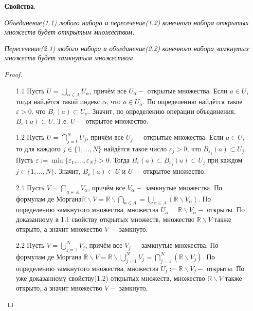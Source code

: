 \documentclass[12pt]{article}
\begin{document}
\textbf{Свойства}.

\textit{Объединение(1.1) любого набора и пересечение(1.2) конечного набора открытых множеств будет открытым множеством.}

\textit{Пересечение(2.1) любого набора и объединение(2.2) конечного набора замкнутых множеств будет замкнутым множеством.}

\begin{proof}

 

\begin{itemize}
    \item[1.1] Пусть $U = \bigcup\limits_{\alpha\in A}U_\alpha$, причём все $U_\alpha - $ открытые множества. Если $a\in U$, тогда найдётся такой индекс $\alpha$, что $a\in U_\alpha$. По определению найдётся такое $\varepsilon > 0$, что $B_\varepsilon(a) \subset U_\alpha$. Значит, по определению операции объединения, $B_\varepsilon(a)\subset U$. Т.е. $U - $ открытое множество.
    \item[1.2] Пусть $U = \bigcap\limits_{j=1}^NU_j$, причём все $U_j - $ открытые множества. Если $a\in U$, то для каждого \newline$j\in \{1,...,N\}$ найдётся такое число $\varepsilon_j>0$, что $B_{\varepsilon_j}(a) \subset U_j$. Пусть $\varepsilon := \min\{\varepsilon_1,...,\varepsilon_N\}>0$. Тогда $B_\varepsilon(a)\subset B_\varepsilon_j(a) \subset U_j$ при каждом $j \in \{1,...,N\}$. Значит, $B_\varepsilon(a) \subset U$ и $U - $ открытое множество.
    \item[2.1] Пусть $V = \bigcap\limits_{\alpha\in A}V_\alpha$, причём все $V_\alpha - $ замкнутые множества. По формулам де Моргана\newline $\mathbb{R}\backslash V = \mathbb{R}\backslash \bigcap\limits_{\alpha\in A} = \bigcup\limits_{\alpha\in A}(\mathbb{R}\backslash V_\alpha)$. По определению замкнутого множества, множества $U_\alpha = \mathbb{R} \backslash V_\alpha - $ открыты. По доказанному в 1.1 свойству открытых множеств, множество $\mathbb{R}\backslash V$ также открыто, а значит множество $V - $ замкнуто.
    \item[2.2] Пусть $V = \bigcup\limits_{j=1}^NV_j$, причём все $V_j - $ замкнутые множества. По формулам де Моргана $\mathbb{R}\backslash V = \mathbb{R}\backslash\bigcup\limits_{j=1}^NV_j=\bigcap\limits_{j=1}^N(\mathbb{R}\backslash V_j).$ По определению замкнутого множества, множества $U_j := \mathbb{R}\backslash V_j - $ открыты. По уже доказанному свойству(1.2) открытых множеств, множество $\mathbb{R}\backslash V$ также открыто, а значит множество $V - $ замкнуто. 
\end{itemize}
\end{proof}
\end{document}
